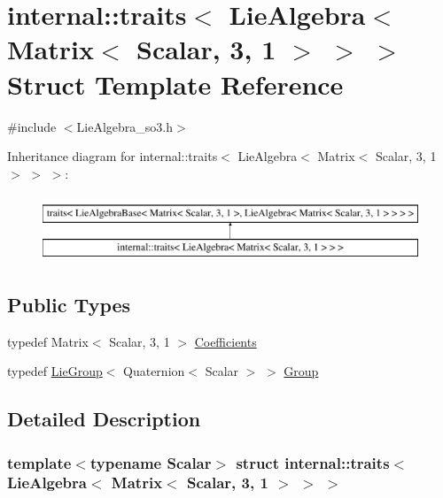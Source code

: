 \hypertarget{structinternal_1_1traits_3_01_lie_algebra_3_01_matrix_3_01_scalar_00_013_00_011_01_4_01_4_01_4}{}\section{internal\+:\+:traits$<$ Lie\+Algebra$<$ Matrix$<$ Scalar, 3, 1 $>$ $>$ $>$ Struct Template Reference}
\label{structinternal_1_1traits_3_01_lie_algebra_3_01_matrix_3_01_scalar_00_013_00_011_01_4_01_4_01_4}


{\ttfamily \#include $<$Lie\+Algebra\+\_\+so3.\+h$>$}

Inheritance diagram for internal\+:\+:traits$<$ Lie\+Algebra$<$ Matrix$<$ Scalar, 3, 1 $>$ $>$ $>$\+:\begin{figure}[H]
\begin{center}
\leavevmode
\includegraphics[height=2.000000cm]{structinternal_1_1traits_3_01_lie_algebra_3_01_matrix_3_01_scalar_00_013_00_011_01_4_01_4_01_4}
\end{center}
\end{figure}
\subsection*{Public Types}
\begin{DoxyCompactItemize}
\item 
typedef Matrix$<$ Scalar, 3, 1 $>$ \hyperlink{structinternal_1_1traits_3_01_lie_algebra_3_01_matrix_3_01_scalar_00_013_00_011_01_4_01_4_01_4_a8ef1db6f76e3e2ca5f0aff3609d06f7c}{Coefficients}
\item 
typedef \hyperlink{class_lie_group}{Lie\+Group}$<$ Quaternion$<$ Scalar $>$ $>$ \hyperlink{structinternal_1_1traits_3_01_lie_algebra_3_01_matrix_3_01_scalar_00_013_00_011_01_4_01_4_01_4_a55e3fb1ea655ef4f7582a54857fe98b1}{Group}
\end{DoxyCompactItemize}


\subsection{Detailed Description}
\subsubsection*{template$<$typename Scalar$>$\newline
struct internal\+::traits$<$ Lie\+Algebra$<$ Matrix$<$ Scalar, 3, 1 $>$ $>$ $>$}



